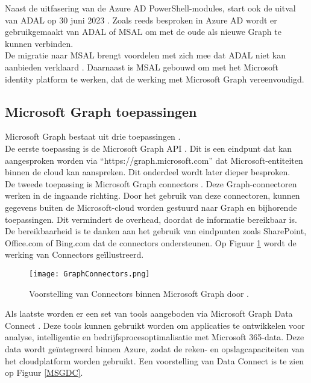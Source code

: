 Naast de uitfasering van de Azure \ac{AD} PowerShell-modules, start ook de uitval van \ac{ADAL} op 30 juni 2023 \autocite{Sahay2022}. Zoals reeds besproken in Azure \ac{AD} wordt er gebruikgemaakt van \ac{ADAL} of \ac{MSAL} om met de oude als nieuwe Graph te kunnen verbinden. \\

De migratie naar \ac{MSAL} brengt voordelen met zich mee dat \ac{ADAL} niet kan aanbieden verklaard \autocite{Microsoft2023m}. Daarnaast is \ac{MSAL} gebouwd om met het Microsoft identity platform te werken, dat de werking met Microsoft Graph vereenvoudigd.



\subsection{Microsoft Graph toepassingen}

Microsoft Graph bestaat uit drie toepassingen \autocite{Microsoft2023d}. \\

De eerste toepassing is de Microsoft Graph \Ac{API} \autocite{Microsoft2022e}. Dit is een eindpunt dat kan aangesproken worden via “https://graph.microsoft.com” dat Microsoft-entiteiten binnen de cloud kan aanspreken. Dit onderdeel wordt later dieper besproken. \\

De tweede toepassing is Microsoft Graph connectors \autocite{Microsoft2022f}. Deze Graph-connectoren werken in de ingaande richting. Door het gebruik van deze connectoren, kunnen gegevens buiten de Microsoft-cloud worden gestuurd naar Graph en bijhorende toepassingen. Dit vermindert de overhead, doordat de informatie bereikbaar is. De bereikbaarheid is te danken aan het gebruik van eindpunten zoals SharePoint, Office.com of Bing.com dat de connectors ondersteunen. Op Figuur \ref{MSGC} wordt de werking van Connectors geïllustreerd. \\

\begin{figure}[!h]
    \texttt{[image: GraphConnectors.png]}
    \caption[Voorbeeld Microsoft Graph Connectors]{Voorstelling van Connectors binnen Microsoft Graph door \textcite{Hay2021}.}
    \label{MSGC}
\end{figure}

Als laatste worden er een set van tools aangeboden via Microsoft Graph Data Connect \autocite{Microsoft2022c}. Deze tools kunnen gebruikt worden om applicaties te ontwikkelen voor analyse, intelligentie en bedrijfsprocesoptimalisatie met Microsoft 365-data. Deze data wordt geïntegreerd binnen Azure, zodat de reken- en opslagcapaciteiten van het cloudplatform worden gebruikt. Een voorstelling van Data Connect is te zien op Figuur \ref{MSGDC}. 

